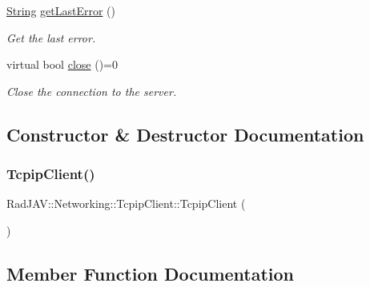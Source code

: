 \begin{DoxyCompactItemize}
\mbox{\hyperlink{class_rad_j_a_v_1_1_string}{String}} \mbox{\hyperlink{class_rad_j_a_v_1_1_networking_1_1_tcpip_client_a06e1ade9aa23df4d251beb2eb96cff4d}{get\+Last\+Error}} ()
\begin{DoxyCompactList}\small\item\em Get the last error. \end{DoxyCompactList}\item 
virtual bool \mbox{\hyperlink{class_rad_j_a_v_1_1_networking_1_1_tcpip_client_a2da2c8b5f71f1d4f16e727d43e26fef8}{close}} ()=0
\begin{DoxyCompactList}\small\item\em Close the connection to the server. \end{DoxyCompactList}\end{DoxyCompactItemize}


\subsection{Constructor \& Destructor Documentation}
\mbox{\label{class_rad_j_a_v_1_1_networking_1_1_tcpip_client_aae23fc057bdef796ad8536ddfe9d23f2}} 
\subsubsection{\texorpdfstring{Tcpip\+Client()}{TcpipClient()}}
{\footnotesize\ttfamily Rad\+J\+A\+V\+::\+Networking\+::\+Tcpip\+Client\+::\+Tcpip\+Client (\begin{DoxyParamCaption}{ }\end{DoxyParamCaption})}



\subsection{Member Function Documentation}
\mbox{\label{class_rad_j_a_v_1_1_networking_1_1_tcpip_client_a2da2c8b5f71f1d4f16e727d43e26fef8}} 
